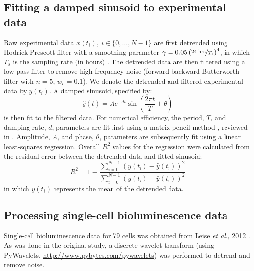 \documentclass[11pt, letterpaper]{article}
\begin{document}
\subsection*{Fitting a damped sinusoid to experimental data}
Raw experimental data $x(t_i), \  i \in \{0, \dots, N-1\}$ are first detrended using Hodrick-Prescott filter with a smoothing parameter $\gamma = 0.05\left(\nicefrac{24 \text{ hrs}}{T_s}\right)^4$, in which $T_s$ is the sampling rate (in hours) \cite{Ravn2002}.
The detrended data are then filtered using a low-pass filter to remove high-frequency noise (forward-backward Butterworth filter with $n = 5,\ w_c = 0.1$).
We denote the detrended and filtered experimental data by $y(t_i)$.
A damped sinusoid, specified by:
\[
  \hat{y}(t) = A e^{-d t} \sin\left(\frac{2\pi t}{T} + \theta\right)
\]
is then fit to the filtered data.
For numerical efficiency, the period, $T$, and damping rate, $d$, parameters are fit first using a matrix pencil method \cite{Hua1990}, reviewed in \cite{Zielinski2011}.
Amplitude, $A$, and phase, $\theta$, parameters are subsequently fit using a linear least-squares regression.
Overall $R^2$ values for the regression were calculated from the residual error between the detrended data and fitted sinusoid:
\[
  R^2 = 1 - \frac{\sum_{i = 0}^{N-1} (y(t_i) - \hat{y}(t_i))^2}{\sum_{i = 0}^{N-1} (y(t_i) - \bar{y}(t_i))^2}
\]
in which $\bar{y}(t_i)$ represents the mean of the detrended data.


\subsection*{Processing single-cell bioluminescence data}

Single-cell bioluminescence data for 79 cells was obtained from Leise {\itshape et al.,} 2012 \cite{Leise2012}.
As was done in the original study, a discrete wavelet transform (using PyWavelets, \url{http://www.pybytes.com/pywavelets}) was performed to detrend and remove noise.
\end{document}
